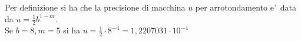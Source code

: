 Per definizione si ha che la precisione di macchina \(u\) per arrotondamento e'\ data da
\(
u=\frac{1}{2} b ^{1-m}
\). \\
Se \(b=8, m=5\) si ha \( u = \frac{1}{2}\cdot 8^{-4} = 1,2207031 \cdot 10^{-4} \)